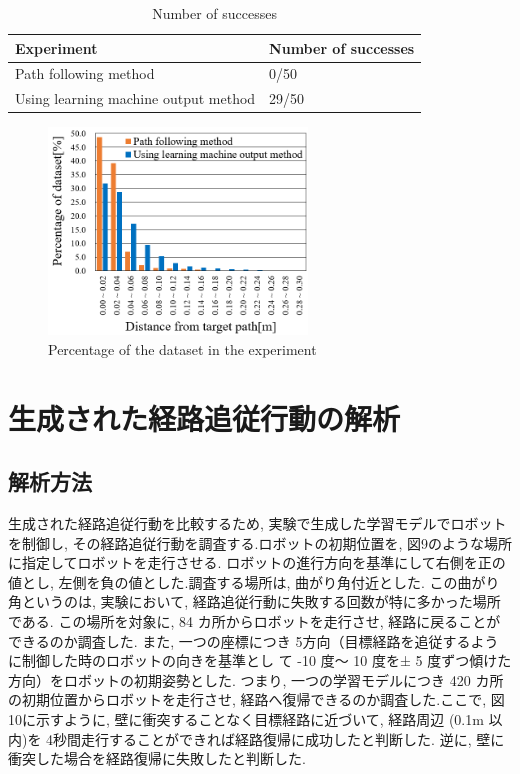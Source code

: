 \documentclass{jarticle}
\begin{document}
\begin{table}[htbp]
  \caption{Number of successes} \vspace*{2mm}\hspace*{-3mm}
    \begin{tabular}{|l|l|}
      \hline\hline
      Experiment & Number of successes \\
      \hline\hline
      Path following method & 0/50 \\
      Using learning machine output method & 29/50 \\
      \hline
    \end{tabular}
\end {table}


\begin{figure}[htbp]
  \centering
   \includegraphics[height=55mm]{./figs/tes.png}
   \caption{Percentage of the dataset in the experiment}
\end{figure}


\section{生成された経路追従行動の解析}
\subsection{解析方法}
生成された経路追従行動を比較するため, 実験で生成した学習モデルでロボットを制御し, 
その経路追従行動を調査する.ロボットの初期位置を,  図9のような場所に指定してロボットを走行させる.
ロボットの進行方向を基準にして右側を正の値とし, 左側を負の値とした.調査する場所は, 曲がり角付近とした. 
この曲がり角というのは, 実験において, 経路追従行動に失敗する回数が特に多かった場所である.
この場所を対象に,  84 カ所からロボットを走行させ, 経路に戻ることができるのか調査した.
また, 一つの座標につき 5方向（目標経路を追従するように制御した時のロボットの向きを基準とし
て -10 度〜 10 度を± 5 度ずつ傾けた方向）をロボットの初期姿勢とした. 
つまり,  一つの学習モデルにつき 420 カ所の初期位置からロボットを走行させ, 
経路へ復帰できるのか調査した.ここで, 図10に示すように, 壁に衝突することなく目標経路に近づいて, 
経路周辺 (0.1m 以内)を 4秒間走行することができれば経路復帰に成功したと判断した.
逆に, 壁に衝突した場合を経路復帰に失敗したと判断した.
\end{document}

